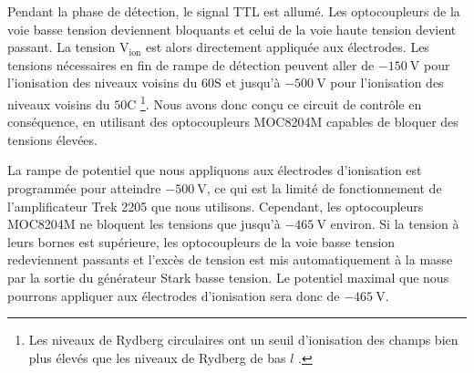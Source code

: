 Pendant la phase de détection, le signal TTL est allumé. Les optocoupleurs de la voie basse tension deviennent bloquants et celui de la voie haute tension devient passant.
La tension $\mathrm{V_{ion}}$ est alors directement appliquée aux électrodes.
Les tensions nécessaires en fin de rampe de détection peuvent aller de $\SI{-150}{\V}$ pour l'ionisation des niveaux voisins du $\mathrm{60S}$ et jusqu'à $\SI{-500}{\V}$ pour l'ionisation des niveaux voisins du $\mathrm{50C}$ \footnote{
Les niveaux de Rydberg circulaires ont un seuil d'ionisation des champs bien plus élevés que les niveaux de Rydberg de bas $l$ \cite{TXT_GALLAGHER}.
}.
Nous avons donc conçu ce circuit de contrôle en conséquence, en utilisant des optocoupleurs MOC8204M capables de bloquer des tensions élevées.

La rampe de potentiel que nous appliquons aux électrodes d'ionisation est programmée pour atteindre $\SI{-500}{\V}$, ce qui est la limité de fonctionnement de l'amplificateur Trek 2205 que nous utilisons.
Cependant, les optocoupleurs MOC8204M ne bloquent les tensions que jusqu'à $\SI{-465}{\V}$ environ.
Si la tension à leurs bornes est supérieure, les optocoupleurs de la voie basse tension redeviennent passants et l'excès de tension est mis automatiquement à la masse par la sortie du générateur \og Stark \fg{}  basse tension.
Le potentiel maximal que nous pourrons appliquer aux électrodes d'ionisation sera donc de $\SI{-465}{\V}$.


